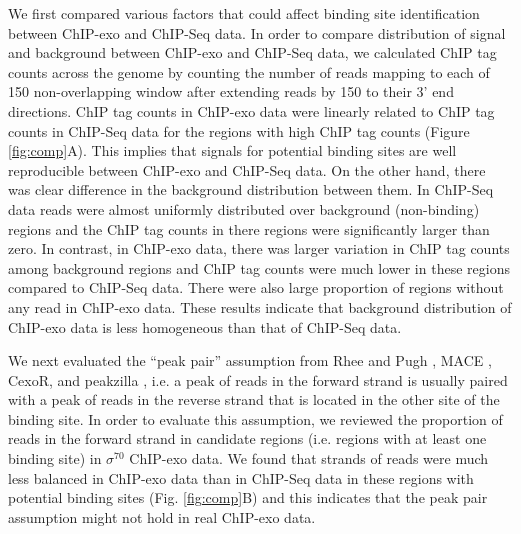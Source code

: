 \documentclass{bmcart}\usepackage[]{graphicx}\usepackage[]{color}
\begin{document}
We first compared various factors that could affect binding site
identification between ChIP-exo and ChIP-Seq data. In order to compare
distribution of signal and background between ChIP-exo and ChIP-Seq
data, we calculated ChIP tag counts across the genome by counting the
number of reads mapping to each of 150 non-overlapping
window after extending reads by 150 to their 3' end
directions. ChIP tag counts in ChIP-exo data were linearly related to
ChIP tag counts in ChIP-Seq data for the regions with high ChIP tag
counts (Figure \ref{fig:comp}A). This implies that signals for
potential binding sites are well reproducible between ChIP-exo and
ChIP-Seq data. On the other hand, there was clear difference in the
background distribution between them. In ChIP-Seq data reads were
almost uniformly distributed over background (non-binding) regions and
the ChIP tag counts in there regions were significantly larger than
zero. In contrast, in ChIP-exo data, there was larger variation in
ChIP tag counts among background regions and ChIP tag counts were much
lower in these regions compared to ChIP-Seq data. There were also
large proportion of regions without any read in ChIP-exo data. These
results indicate that background distribution of ChIP-exo data is less
homogeneous than that of ChIP-Seq data.

We next evaluated the ``peak pair'' assumption from Rhee and Pugh
\cite{exo1}, MACE \cite{mace}, CexoR, \cite{cexor} and peakzilla
\cite{peakzilla}, i.e. a peak of reads in the forward strand is
usually paired with a peak of reads in the reverse strand that is
located in the other site of the binding site. In order to evaluate
this assumption, we reviewed the proportion of reads in the forward
strand in candidate regions (i.e. regions with at least one binding
site) in $\sigma^{70}$ ChIP-exo data. We found that strands of reads
were much less balanced in ChIP-exo data than in ChIP-Seq data in
these regions with potential binding sites (Fig. \ref{fig:comp}B) and
this indicates that the peak pair assumption might not hold in real
ChIP-exo data.

\end{document}
